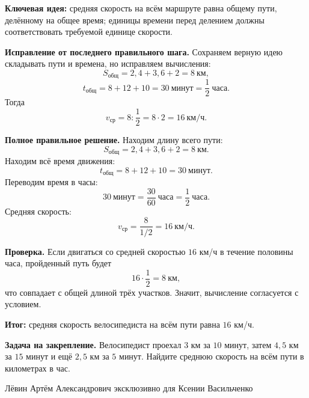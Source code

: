 \documentclass[12pt,a4paper]{article}
\begin{document}
\textcolor{blue!60!black}{\textbf{Ключевая идея:}} средняя скорость на всём маршруте равна общему пути, делённому на общее время; единицы времени перед делением должны соответствовать требуемой единице скорости.

\textbf{Исправление от последнего правильного шага.}
Сохраняем верную идею складывать пути и времена, но исправляем вычисления:
\[
S_{\text{общ}}=2{,}4+3{,}6+2=8\ \text{км},
\]
\[
t_{\text{общ}}=8+12+10=30\ \text{минут}=\frac12\ \text{часа}.
\]
Тогда
\[
v_{\text{ср}}=8:\frac12=8\cdot 2=16\ \text{км/ч}.
\]

\textbf{Полное правильное решение.}
Находим длину всего пути:
\[
S_{\text{общ}}=2{,}4+3{,}6+2=8\ \text{км}.
\]
Находим всё время движения:
\[
t_{\text{общ}}=8+12+10=30\ \text{минут}.
\]
Переводим время в часы:
\[
30\ \text{минут}=\frac{30}{60}\ \text{часа}=\frac12\ \text{часа}.
\]
Средняя скорость:
\[
v_{\text{ср}}=\frac{8}{1/2}=16\ \text{км/ч}.
\]

\textbf{Проверка.}
Если двигаться со средней скоростью $16$ км/ч в течение половины часа, пройденный путь будет
\[
16\cdot\frac12=8\ \text{км},
\]
что совпадает с общей длиной трёх участков. Значит, вычисление согласуется с условием.

\textcolor{teal!60!black}{\textbf{Итог:}} средняя скорость велосипедиста на всём пути равна $16$ км/ч.

\textbf{Задача на закрепление.} Велосипедист проехал $3$ км за $10$ минут, затем $4{,}5$ км за $15$ минут и ещё $2{,}5$ км за $5$ минут. Найдите среднюю скорость на всём пути в километрах в час.

\vfill
\begin{center}
\small Лёвин Артём Александрович эксклюзивно для Ксении Васильченко
\end{center}
\end{document}
